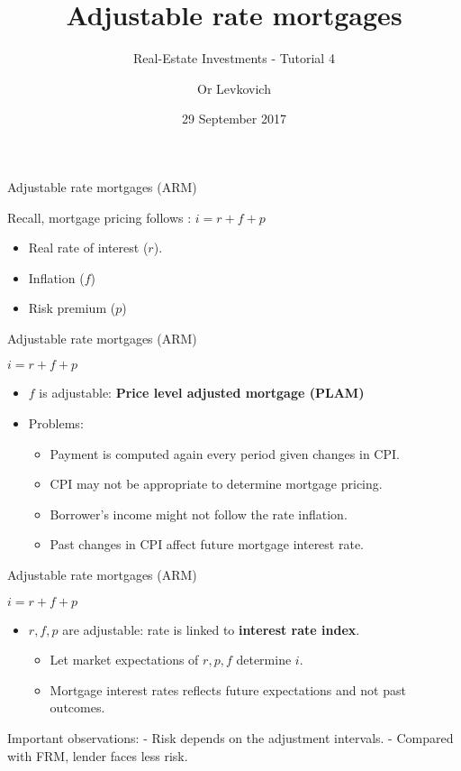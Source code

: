 \documentclass[ignorenonframetext,]{beamer}
\title{Adjustable rate mortgages}
\subtitle{Real-Estate Investments - Tutorial 4}
\author{Or Levkovich}
\date{29 September 2017}
\providecommand{\tightlist}{%
\setlength{\itemsep}{0pt}\setlength{\parskip}{0pt}}
\begin{document}
\frame{\titlepage}

\begin{frame}{Adjustable rate mortgages (ARM)}

Recall, mortgage pricing follows : \(i = r + f + p\)

\begin{itemize}
\tightlist
\item
  Real rate of interest (\(r\)).
\item
  Inflation (\(f\))
\item
  Risk premium (\(p\))
\end{itemize}

\end{frame}

\begin{frame}{Adjustable rate mortgages (ARM)}

\(i = r + f + p\)

\begin{itemize}
\item
  \(f\) is adjustable: \textbf{Price level adjusted mortgage (PLAM)}
\item
  Problems:

  \begin{itemize}
  \tightlist
  \item
    Payment is computed again every period given changes in CPI.
  \item
    CPI may not be appropriate to determine mortgage pricing.
  \item
    Borrower's income might not follow the rate inflation.
  \item
    Past changes in CPI affect future mortgage interest rate.
  \end{itemize}
\end{itemize}

\end{frame}

\begin{frame}{Adjustable rate mortgages (ARM)}

\(i = r + f + p\)

\begin{itemize}
\tightlist
\item
  \(r, f, p\) are adjustable: rate is linked to \textbf{interest rate
  index}.

  \begin{itemize}
  \tightlist
  \item
    Let market expectations of \(r, p, f\) determine \(i\).
  \item
    Mortgage interest rates reflects future expectations and not past
    outcomes.
  \end{itemize}
\end{itemize}

Important observations: - Risk depends on the adjustment intervals. -
Compared with FRM, lender faces less risk.

\end{frame}
\end{document}
